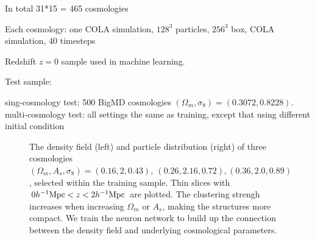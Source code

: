 \documentclass[twocolumn]{aastex61}
\begin{document}
In total 31*15 = 465 cosmologies


Each cosmology: one COLA simulation, $128^3$ particles, $256^3$ box, COLA simulation, 40 timesteps


Redshift $z=0$ sample used in machine learning.

Test sample:

sing-cosmology test: 500 BigMD cosmologies $(\Omega_m, \sigma_8)=(0.3072,0.8228)$.
multi-cosmology test: all settings the same as training, except that using different initial condition 





\begin{figure}
   \caption{\label{fig_field}
   The density field (left) and particle distribution (right) of 
    three cosmologies 
    $(\Omega_m, A_s, \sigma_8)=(0.16,2,0.43),\ (0.26, 2.16, 0.72), (0.36, 2.0, 0.89)$,
    selected within the training sample.
   Thin slices with $0 h^{-1} {\rm Mpc}<z<2 h^{-1} {\rm Mpc}$ are plotted.
   The clustering strengh increases when increasing $\Omega_m$ or $A_s$, making the structures more compact.
   We train the neuron network to build up the connection between the density field and underlying cosmological parameters.
   }
\end{figure}
\end{document}
